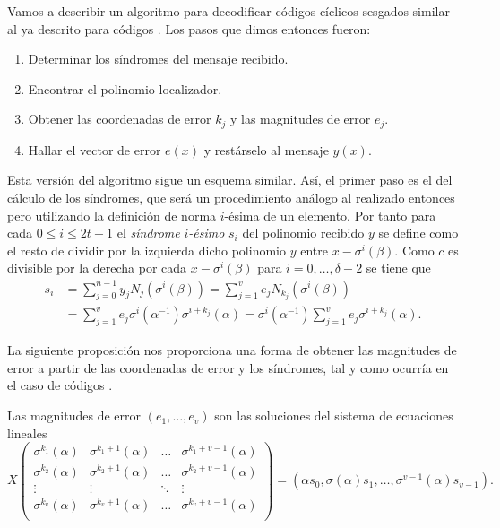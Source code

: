 Vamos a describir un algoritmo para decodificar códigos cíclicos sesgados similar al ya descrito para códigos .
Los pasos que dimos entonces fueron: \begin{enumerate}
  \item Determinar los síndromes del mensaje recibido.
  \item Encontrar el polinomio localizador.
  \item Obtener las coordenadas de error \(k_j\) y las magnitudes de error \(e_{j}\).
  \item Hallar el vector de error \(e(x)\) y restárselo al mensaje \(y(x)\).
\end{enumerate}
Esta versión del algoritmo sigue un esquema similar.
Así, el primer paso es el del cálculo de los síndromes, que será un procedimiento análogo al realizado entonces pero utilizando la definición de norma \(i\)-ésima de un elemento.
Por tanto para cada \(0 \leq i \leq 2t - 1\) el \emph{síndrome} \(i\)\emph{-ésimo} \(s_i\) del polinomio recibido \(y\) se define como el resto de dividir por la izquierda dicho polinomio \(y\) entre \(x - \sigma^{i}(\beta)\).
Como \(c\) es divisible por la derecha por cada \(x - \sigma^{i}(\beta)\) para \(i = 0, \dots, \delta - 2\) se tiene que 
\begin{align}
  s_i &= \sum_{j = 0}^{n-1}y_jN_j(\sigma^{i}(\beta)) = \sum_{j=1}^{v}e_jN_{k_j}(\sigma^{i}(\beta))\nonumber\\
   &= \sum_{j = 1}^{v}e_j\sigma^{i}(\alpha^{-1})\sigma^{i+k_j}(\alpha) = \sigma^{i}(\alpha^{-1})\sum_{j = 1}^{v}e_j\sigma^{i+k_j}(\alpha).
   \label{eq:sindromes-sesgados}
\end{align}

La siguiente proposición nos proporciona una forma de obtener las magnitudes de error a partir de las coordenadas de error y los síndromes, tal y como ocurría en el caso de códigos .

\begin{proposition}
  \label{prop:pgz-sesgados-magnitudes-error}
  Las magnitudes de error \((e_{1}, \dots, e_{v})\) son las soluciones del sistema de ecuaciones lineales
  \[
    X \begin{pmatrix}
     \sigma^{k_1}(\alpha) & \sigma^{k_1 + 1}(\alpha) & \dots & \sigma^{k_1 + v - 1}(\alpha)\\ 
     \sigma^{k_2}(\alpha) & \sigma^{k_2 + 1}(\alpha) & \dots & \sigma^{k_2 + v - 1}(\alpha)\\ 
     \vdots & \vdots & \ddots & \vdots\\ 
     \sigma^{k_v}(\alpha) & \sigma^{k_v + 1}(\alpha) & \dots & \sigma^{k_v + v - 1}(\alpha)\\ 
    \end{pmatrix}
    = (\alpha s_0, \sigma(\alpha)s_1, \dots, \sigma^{v-1}(\alpha)s_{v-1}).
  \]
\end{proposition}

